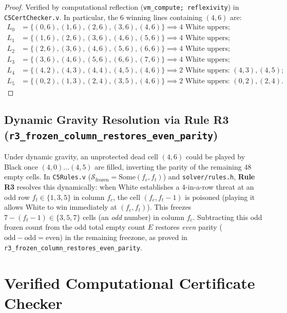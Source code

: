 \documentclass[11pt,reqno]{amsart}
\theoremstyle{plain}
\theoremstyle{definition}
\theoremstyle{remark}
\begin{document}
\begin{proof}
Verified by computational reflection (\texttt{vm\_compute; reflexivity}) in \texttt{C5CertChecker.v}. In particular, the 6 winning lines containing $(4, 6)$ are:
\begin{align*}
L_0 &= \{(0,6), (1,6), (2,6), (3,6), (4,6)\} \implies 4 \text{ White uppers}; \\
L_1 &= \{(1,6), (2,6), (3,6), (4,6), (5,6)\} \implies 4 \text{ White uppers}; \\
L_2 &= \{(2,6), (3,6), (4,6), (5,6), (6,6)\} \implies 4 \text{ White uppers}; \\
L_3 &= \{(3,6), (4,6), (5,6), (6,6), (7,6)\} \implies 4 \text{ White uppers}; \\
L_4 &= \{(4,2), (4,3), (4,4), (4,5), (4,6)\} \implies 2 \text{ White uppers: } (4,3), (4,5); \\
L_5 &= \{(0,2), (1,3), (2,4), (3,5), (4,6)\} \implies 2 \text{ White uppers: } (0,2), (2,4).
\end{align*}
\end{proof}

\subsection{Dynamic Gravity Resolution via Rule R3 (\texttt{r3\_frozen\_column\_restores\_even\_parity})}
Under dynamic gravity, an unprotected dead cell $(4,6)$ could be played by Black once $(4,0)\dots(4,5)$ are filled, inverting the parity of the remaining 48 empty cells. In \texttt{C5Rules.v} ($\mathcal{S}_{\text{frozen}} = \text{Some}(f_c, f_t)$) and \texttt{solver/rules.h}, \textbf{Rule R3} resolves this dynamically: when White establishes a 4-in-a-row threat at an odd row $f_t \in \{1, 3, 5\}$ in column $f_c$, the cell $(f_c, f_t - 1)$ is poisoned (playing it allows White to win immediately at $(f_c, f_t)$). This freezes $7 - (f_t - 1) \in \{3, 5, 7\}$ cells (an \emph{odd} number) in column $f_c$. Subtracting this odd frozen count from the odd total empty count $E$ restores \emph{even} parity ($\text{odd} - \text{odd} = \text{even}$) in the remaining freezone, as proved in \texttt{r3\_frozen\_column\_restores\_even\_parity}.

\section{Verified Computational Certificate Checker}
\end{document}
